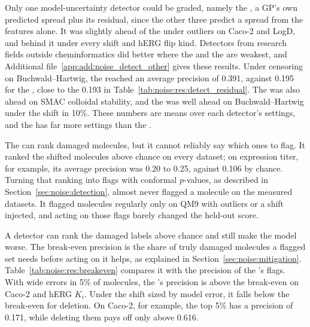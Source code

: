 Only one model-uncertainty detector could be graded, namely the , a GP's own predicted spread plus its residual, since the other three predict a spread from the features alone. It was slightly ahead of the  under outliers on Caco-2 and LogD, and behind it under every shift and hERG flip kind. Detectors from research fields outside cheminformatics did better where the  and the  are weakest, and Additional file~\ref{app:add:noise_detect_other} gives these results. Under censoring on Buchwald--Hartwig, the  reached an average precision of 0.391, against 0.195 for the , close to the 0.193 in Table~\ref{tab:noise:res:detect_residual}. The  was also ahead on SMAC colloidal stability, and the  was well ahead on Buchwald--Hartwig under the shift in 10\%. These numbers are means over each detector's settings, and the  has far more settings than the .

The  can rank damaged molecules, but it cannot reliably say which ones to flag. It ranked the shifted molecules above chance on every dataset; on expression titer, for example, its average precision was 0.20 to 0.25, against 0.106 by chance. Turning that ranking into flags with conformal $p$-values, as described in Section~\ref{sec:noise:detection}, almost never flagged a molecule on the measured datasets. It flagged molecules regularly only on QM9 with outliers or a shift injected, and acting on those flags barely changed the held-out score.

A detector can rank the damaged labels above chance and still make the model worse. The break-even precision is the share of truly damaged molecules a flagged set needs before acting on it helps, as explained in Section~\ref{sec:noise:mitigation}. Table~\ref{tab:noise:res:breakeven} compares it with the precision of the 's flags. With wide errors in 5\% of molecules, the 's precision is above the break-even on Caco-2 and hERG $K_i$. Under the shift sized by model error, it falls below the break-even for deletion. On Caco-2, for example, the top 5\% has a precision of 0.171, while deleting them pays off only above 0.616.

